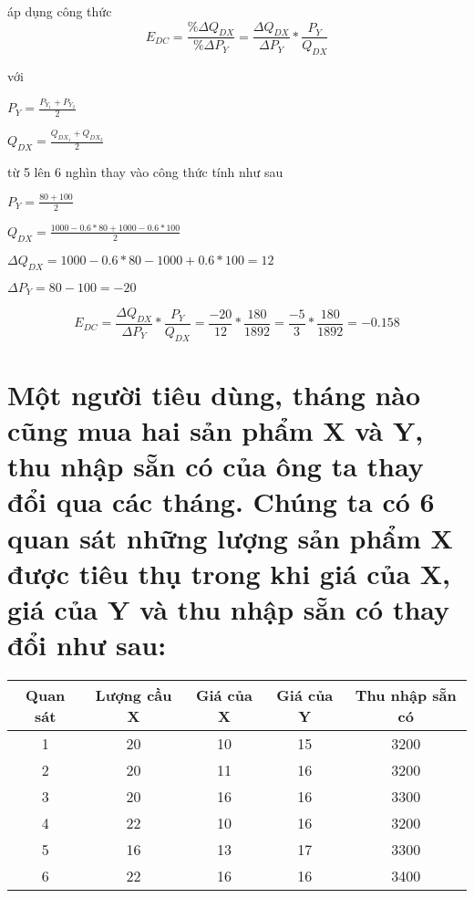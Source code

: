 \begin{enumerate}[a.]
        áp dụng công thức
        \[ E_{DC} = \frac{\% \Delta Q_{DX}}{\% \Delta P_{Y}}
          =  \frac{ \Delta Q_{DX}}{\Delta P_{Y}} * \frac{P_{Y}}{Q_{DX}} \]

        với

        $P_{Y} = \frac{P_{Y_1} + P_{Y_2}}{2}$

        $Q_{DX} = \frac{Q_{DX_1} + Q_{DX_2}}{2}$

        từ 5 lên 6 nghìn
        thay vào công thức tính như sau

        $P_{Y} = \frac{80 + 100 }{2}$

        $Q_{DX} = \frac{1000 - 0.6 * 80 + 1000 - 0.6 * 100}{2}$

        $\Delta Q_{DX} = 1000 - 0.6 * 80 - 1000 + 0.6 * 100 = 12$

        $\Delta P_{Y} = 80 - 100 = -20$

        \[ E_{DC} = \frac{ \Delta Q_{DX}}{\Delta P_{Y}} * \frac{P_{Y}}{Q_{DX}}
          = \frac{-20}{12} * \frac{180}{1892} = \frac{-5}{3} * \frac{180}{1892} = -0.158\]


\end{enumerate}

\section{ Một người tiêu dùng, tháng nào cũng mua hai sản phẩm X và Y, thu nhập sẵn
  có của ông ta thay đổi qua các tháng. Chúng ta có 6 quan sát những lượng sản phẩm
  X được tiêu thụ trong khi giá của X, giá của Y và thu nhập sẵn có thay đổi như sau:}


\begin{tabular}{|c|c|c|c|c|}
  \hline
  Quan sát & Lượng cầu X & Giá của X & Giá của Y & Thu nhập sẵn có \\
  \hline
  1        & 20          & 10        & 15        & 3200            \\
  \hline
  2        & 20          & 11        & 16        & 3200            \\
  \hline
  3        & 20          & 16        & 16        & 3300            \\
  \hline
  4        & 22          & 10        & 16        & 3200            \\
  \hline
  5        & 16          & 13        & 17        & 3300            \\
  \hline
  6        & 22          & 16        & 16        & 3400            \\
  \hline
\end{tabular}

